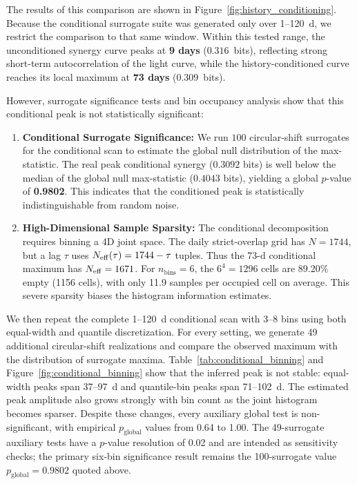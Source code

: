 \documentclass[fleqn,usenatbib]{mnras}
\begin{document}
The results of this comparison are shown in Figure~\ref{fig:history_conditioning}. Because the conditional surrogate suite was generated only over 1--120~d, we restrict the comparison to that same window. Within this tested range, the unconditioned synergy curve peaks at \textbf{9 days} ($0.316$~bits), reflecting strong short-term autocorrelation of the light curve, while the history-conditioned curve reaches its local maximum at \textbf{73 days} ($0.309$~bits).

However, surrogate significance tests and bin occupancy analysis show that this conditional peak is not statistically significant:
\begin{enumerate}
    \item \textbf{Conditional Surrogate Significance:} We run $100$ circular-shift surrogates for the conditional scan to estimate the global null distribution of the max-statistic. The real peak conditional synergy ($0.3092$ bits) is well below the median of the global null max-statistic ($0.4043$ bits), yielding a global $p$-value of \textbf{0.9802}. This indicates that the conditioned peak is statistically indistinguishable from random noise.
    \item \textbf{High-Dimensional Sample Sparsity:} The conditional decomposition requires binning a 4D joint space. The daily strict-overlap grid has $N=1744$, but a lag $\tau$ uses $N_{\rm eff}(\tau)=1744-\tau$ tuples. Thus the 73-d conditional maximum has $N_{\rm eff}=1671$. For $n_{\mathrm{bins}}=6$, the $6^4=1296$ cells are 89.20\% empty (1156 cells), with only 11.9 samples per occupied cell on average. This severe sparsity biases the histogram information estimates.
\end{enumerate}
We then repeat the complete 1--120~d conditional scan with 3--8 bins using both equal-width and quantile discretization. For every setting, we generate 49 additional circular-shift realizations and compare the observed maximum with the distribution of surrogate maxima. Table~\ref{tab:conditional_binning} and Figure~\ref{fig:conditional_binning} show that the inferred peak is not stable: equal-width peaks span 37--97~d and quantile-bin peaks span 71--102~d. The estimated peak amplitude also grows strongly with bin count as the joint histogram becomes sparser. Despite these changes, every auxiliary global test is non-significant, with empirical $p_{\mathrm{global}}$ values from 0.64 to 1.00. The 49-surrogate auxiliary tests have a $p$-value resolution of 0.02 and are intended as sensitivity checks; the primary six-bin significance result remains the 100-surrogate value $p_{\mathrm{global}}=0.9802$ quoted above.
\end{document}
